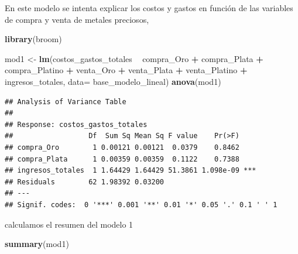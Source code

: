 \documentclass[
  11pt,
  a4paper,
]{book}
\newenvironment{Shaded}{\begin{snugshade}}{\end{snugshade}}
\newcommand{\DataTypeTok}[1]{\textcolor[rgb]{0.13,0.29,0.53}{#1}}
\newcommand{\KeywordTok}[1]{\textcolor[rgb]{0.13,0.29,0.53}{\textbf{#1}}}
\newcommand{\NormalTok}[1]{#1}
\newcommand{\OperatorTok}[1]{\textcolor[rgb]{0.81,0.36,0.00}{\textbf{#1}}}
\newcommand{\StringTok}[1]{\textcolor[rgb]{0.31,0.60,0.02}{#1}}
\begin{document}
En este modelo se intenta explicar los costos y gastos en función de las
variables de compra y venta de metales preciosos,

\begin{Shaded}
\begin{Highlighting}[]
\KeywordTok{library}\NormalTok{(broom)}

\NormalTok{mod1 <-}\StringTok{ }\KeywordTok{lm}\NormalTok{(costos_gastos_totales }\OperatorTok{~}\StringTok{  }\NormalTok{compra_Oro }\OperatorTok{+}\StringTok{ }\NormalTok{compra_Plata }\OperatorTok{+}\StringTok{ }\NormalTok{compra_Platino }\OperatorTok{+}\StringTok{ }
\StringTok{        }\NormalTok{venta_Oro }\OperatorTok{+}\StringTok{ }\NormalTok{venta_Plata }\OperatorTok{+}\StringTok{ }\NormalTok{venta_Platino }\OperatorTok{+}\StringTok{ }\NormalTok{ingresos_totales, }
        \DataTypeTok{data=}\NormalTok{ base_modelo_lineal) }
\KeywordTok{anova}\NormalTok{(mod1)}
\end{Highlighting}
\end{Shaded}

\begin{verbatim}
## Analysis of Variance Table
## 
## Response: costos_gastos_totales
##                  Df  Sum Sq Mean Sq F value    Pr(>F)    
## compra_Oro        1 0.00121 0.00121  0.0379    0.8462    
## compra_Plata      1 0.00359 0.00359  0.1122    0.7388    
## ingresos_totales  1 1.64429 1.64429 51.3861 1.098e-09 ***
## Residuals        62 1.98392 0.03200                      
## ---
## Signif. codes:  0 '***' 0.001 '**' 0.01 '*' 0.05 '.' 0.1 ' ' 1
\end{verbatim}

calculamos el resumen del modelo 1

\begin{Shaded}
\begin{Highlighting}[]
\KeywordTok{summary}\NormalTok{(mod1)}
\end{Highlighting}
\end{Shaded}
\end{document}
